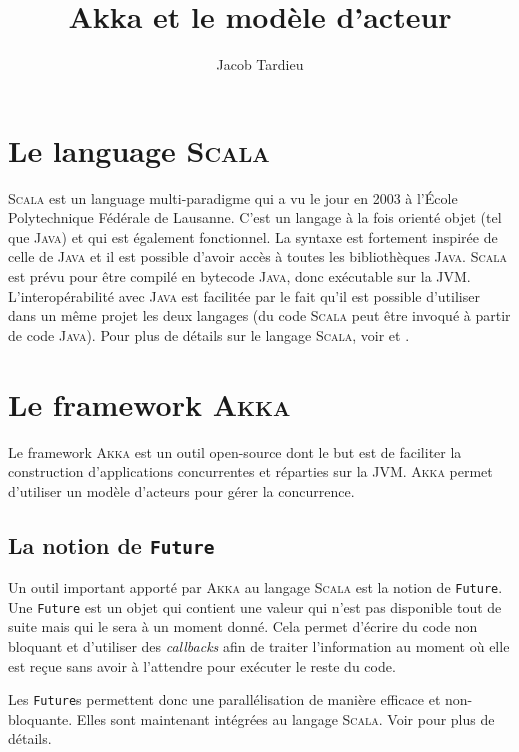 \documentclass[11pt,a4paper]{article}
\title{Akka et le modèle d'acteur}
\author{Jacob Tardieu}
\begin{document}
\maketitle

\section{Le language \textsc{Scala}}
\textsc{Scala} \cite{scala:website} est un language multi-paradigme qui a vu le jour en 2003 à l'École Polytechnique Fédérale de Lausanne. C'est un langage à la fois orienté objet (tel que \textsc{Java}) et qui est également fonctionnel. La syntaxe est fortement inspirée de celle de \textsc{Java} et il est possible d'avoir accès à toutes les bibliothèques \textsc{Java}. \textsc{Scala} est prévu pour être compilé en bytecode \textsc{Java}, donc exécutable sur la JVM. L'interopérabilité avec \textsc{Java} est facilitée par le fait qu'il est possible d'utiliser dans un même projet les deux langages (du code \textsc{Scala} peut être invoqué à partir de code \textsc{Java}).
Pour plus de détails sur le langage \textsc{Scala}, voir \cite{wiki:scala} et \cite{scala:website}.

\section{Le framework \textsc{Akka}}
Le framework \textsc{Akka} \cite{akka:website} est un outil open-source dont le but est de faciliter la construction d'applications concurrentes et réparties sur la JVM. \textsc{Akka} permet d'utiliser un modèle d'acteurs pour gérer la concurrence.

\subsection{La notion de \texttt{Future}}
Un outil important apporté par \textsc{Akka} au langage \textsc{Scala} est la notion de \texttt{Future}. Une \texttt{Future} est un objet qui contient une valeur qui n'est pas disponible tout de suite mais qui le sera à un moment donné.
Cela permet d'écrire du code non bloquant et d'utiliser des \textit{callbacks} afin de traiter l'information au moment où elle est reçue sans avoir à l'attendre pour exécuter le reste du code.

Les \texttt{Future}s permettent donc une parallélisation de manière efficace et non-bloquante. Elles sont maintenant intégrées au langage \textsc{Scala}. Voir \cite{scala:futures} pour plus de détails.
\end{document}
